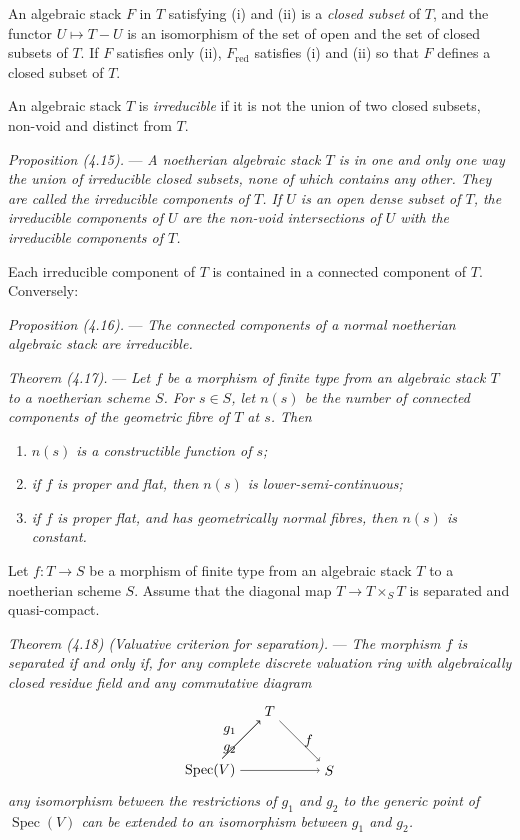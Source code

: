 \documentclass[10pt]{article}
\newcommand{\Spec}{\operatorname{Spec}}
\begin{document}
An algebraic stack $F$ in $T$ satisfying (i) and (ii) is a \emph{closed subset} of $T$, and the functor $U\mapsto T-U$ is an isomorphism of the set of open and the set of closed subsets of $T$. If $F$ satisfies only (ii), $F_{\mathrm{red}}$ satisfies (i) and (ii) so that $F$ defines a closed subset of $T$.

An algebraic stack $T$ is \emph{irreducible} if it is not the union of two closed subsets, non-void and distinct from $T$.

\medskip
\noindent\emph{Proposition (4.15).} --- \emph{A noetherian algebraic stack $T$ is in one and only one way the union of irreducible closed subsets, none of which contains any other. They are called the irreducible components of $T$. If $U$ is an open dense subset of $T$, the irreducible components of $U$ are the non-void intersections of $U$ with the irreducible components of $T$.}

Each irreducible component of $T$ is contained in a connected component of $T$. Conversely:

\medskip
\noindent\emph{Proposition (4.16).} --- \emph{The connected components of a normal noetherian algebraic stack are irreducible.}

\medskip
\noindent\emph{Theorem (4.17).} --- \emph{Let $f$ be a morphism of finite type from an algebraic stack $T$ to a noetherian scheme $S$. For $s\in S$, let $n(s)$ be the number of connected components of the geometric fibre of $T$ at $s$. Then}
\begin{enumerate}[label=(\roman*)]
\item \emph{$n(s)$ is a constructible function of $s$;}
\item \emph{if $f$ is proper and flat, then $n(s)$ is lower-semi-continuous;}
\item \emph{if $f$ is proper flat, and has geometrically normal fibres, then $n(s)$ is constant.}
\end{enumerate}

Let $f:T\to S$ be a morphism of finite type from an algebraic stack $T$ to a noetherian scheme $S$. Assume that the diagonal map $T\to T\times_S T$ is separated and quasi-compact.

\medskip
\noindent\emph{Theorem (4.18) (Valuative criterion for separation).} --- \emph{The morphism $f$ is separated if and only if, for any complete discrete valuation ring with algebraically closed residue field and any commutative diagram}
\[
\begin{tikzpicture}[baseline=(current bounding box.center)]
\node (T) at (1.5,1.5) {$T$};
\node (V) at (0,0) {$\Spec(V)$};
\node (S) at (3,0) {$S$};
\draw[->] (V) -- node[above left] {$g_1$} (T);
\draw[->] (V) -- node[below left] {$g_2$} (T);
\draw[->] (V) -- (S);
\draw[->] (T) -- node[right] {$f$} (S);
\end{tikzpicture}
\]
\emph{any isomorphism between the restrictions of $g_1$ and $g_2$ to the generic point of $\Spec(V)$ can be extended to an isomorphism between $g_1$ and $g_2$.}
\end{document}
